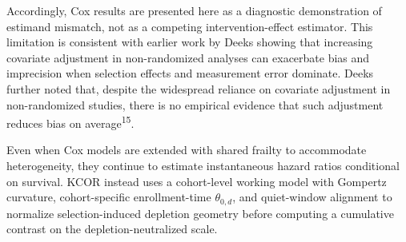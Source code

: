 \documentclass[
]{article}
\begin{document}
Accordingly, Cox results are presented here as a diagnostic demonstration of estimand mismatch, not as a competing intervention-effect estimator. This limitation is consistent with earlier work by Deeks showing that increasing covariate adjustment in non-randomized analyses can exacerbate bias and imprecision when selection effects and measurement error dominate. Deeks further noted that, despite the widespread reliance on covariate adjustment in non-randomized studies, there is no empirical evidence that such adjustment reduces bias on average\textsuperscript{15}.

Even when Cox models are extended with shared frailty to accommodate heterogeneity, they continue to estimate instantaneous hazard ratios conditional on survival. KCOR instead uses a cohort-level working model with Gompertz curvature, cohort-specific enrollment-time \(\theta_{0,d}\), and quiet-window alignment to normalize selection-induced depletion geometry before computing a cumulative contrast on the depletion-neutralized scale.
\end{document}
